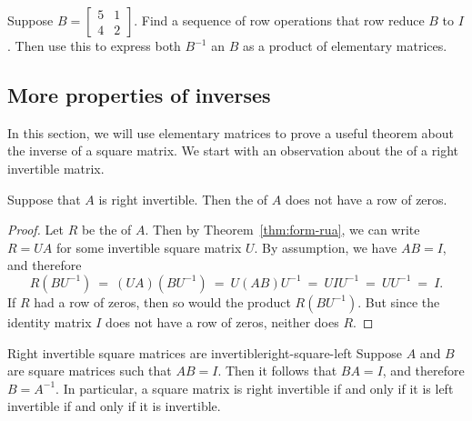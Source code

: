 \documentclass{ximera}
\begin{document}
\begin{exercise} Suppose $B = \begin{bmatrix} 5 & 1\\4 & 2\end{bmatrix}$. Find a sequence of row operations that row reduce $B$ to $I$. Then use this to express both $B^{-1}$ an $B$ as a product of elementary matrices.
 
\end{exercise}



\subsection*{More properties of inverses}


In this section, we will use elementary matrices to prove a useful
theorem about the inverse of a square matrix. We start with an
observation about the {\ef} of a right invertible matrix.

\begin{lemma}
  Suppose that $A$ is right invertible. Then the {\rref} of $A$ does
  not have a row of zeros.
\end{lemma}

\begin{proof}
  Let $R$ be the {\rref} of $A$. Then by Theorem~\ref{thm:form-rua},
  we can write $R=UA$ for some invertible square matrix $U$. By
  assumption, we have $AB=I$, and therefore
  \begin{equation*}
    R(BU^{-1})
    ~=~
    (UA)(BU^{-1})
    ~=~
    U(AB)U^{-1}
    ~=~
    UIU^{-1}
    ~=~
    UU^{-1}
    ~=~
    I.
  \end{equation*}
  If $R$ had a row of zeros, then so would the product
  $R(BU^{-1})$. But since the identity matrix $I$ does not have a row
  of zeros, neither does $R$.
\end{proof}

\begin{theorem}{Right invertible square matrices are invertible}{right-square-left}
  Suppose $A$ and $B$ are square matrices such that $AB=I$. Then it
  follows that $BA=I$, and therefore $B=A^{-1}$. In particular, a
  square matrix is right invertible if and only if it is left
  invertible if and only if it is invertible.
\end{theorem}
\end{document}
